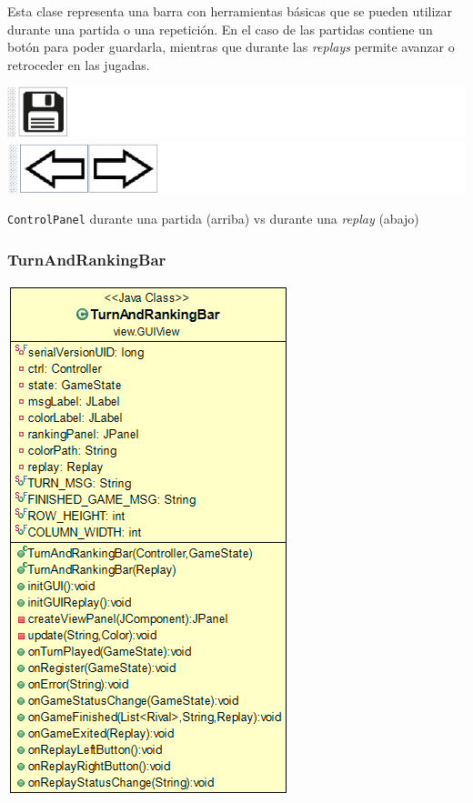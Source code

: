 \documentclass[../DocumentoOficial.tex]{subfiles}
\begin{document}
Esta clase representa una barra con herramientas básicas que se pueden utilizar durante una partida o una repetición. En el caso de las partidas contiene un botón para poder guardarla, mientras que durante las \textit{replays} permite avanzar o retroceder en las jugadas.
\begin{center}
\includegraphics[scale=0.65]{controlpanel-partida.png}
\includegraphics[scale=0.65]{controlpanel-replay.png}

\texttt{ControlPanel} durante una partida (arriba) vs durante una \textit{replay} (abajo)
\end{center}

\subsubsection{TurnAndRankingBar}
\begin{center}
\includegraphics[scale=0.60]{turnranking-uml.png}
\end{center}
\end{document}
